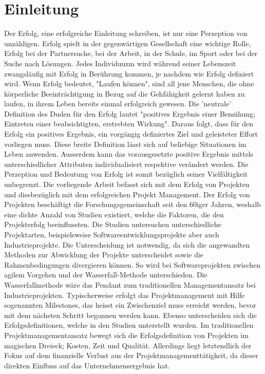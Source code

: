 \section{Einleitung}
Der Erfolg, eine erfolgreiche Einleitung schreiben, ist nur eine Perzeption von unzähligen. Erfolg spielt in der gegenwärtigen Gesellschaft eine wichtige Rolle, Erfolg bei der Partnersuche, bei der Arbeit, in der Schule, im Sport oder bei der Suche nach Lösungen. Jedes Individuuzm wird während seiner Lebenszeit zwangsläufig mit Erfolg in Berührung kommen, je nachdem wie Erfolg definiert wird. Wenn Erfolg bedeutet, "Laufen können", sind all jene Menschen, die ohne körperliche Beeinträchtigung in Bezug auf die Gehfähigkeit gelernt haben zu laufen, in ihrem Leben bereits einmal erfolgreich gewesen. Die 'neutrale' Definition des Duden für den Erfolg lautet "positives Ergebnis einer Bemühung; Eintreten einer beabsichtigten, erstrebten Wirkung". Daraus folgt, dass für den Erfolg ein positives Ergebnis, ein vorgängig definiertes Ziel und geleisteter Effort vorliegen muss. Diese breite Definition lässt sich auf beliebige Situationen im Leben anwenden. Ausserdem kann das vorausgesetzte positive Ergebnis mittels unterschiedlicher Attributen individualisiert respektive verändert werden. Die Perzeption und Bedeutung von Erfolg ist somit bezüglich seiner Vielfältigkeit unbegrenzt.
\newline Die vorliegende Arbeit befasst sich mit dem Erfolg von Projekten und diesbezüglich mit dem erfolgreichen Projekt Management. Der Erfolg von Projekten beschäftigt die Forschungsgemeinschaft seit den 60iger Jahren, weshalb eine dichte Anzahl von Studien existiert, welche die Faktoren, die den Projekterfolg beeinflussten. Die Studien untersuchen unterschiedliche Projektarten, beispielsweise Softwareentwicklungsprojekte aber auch Industrieprojekte. Die Unterscheidung ist notwendig, da sich die angewandten Methoden zur Abwicklung der Projekte unterscheidet sowie die Rahmenbedingungen divergieren können. So wird bei Softwareprojekten zwischen agilem Vorgehen und der Wasserfall-Methode unterschieden. Die Wasserfallmethode wäre das Pendant zum traditionellen Managementansatz bei Industrieprojekten. Typischerweise erfolgt das Projektmanagement mit Hilfe sogenannten Milestones, das heisst ein Zwischenziel muss erreicht werden, bevor mit dem nächsten Schritt begonnen werden kann. Ebenso unterscheiden sich die Erfolgsdefinitionen, welche in den Studien unterstellt wurden. Im traditionellen Projektmanagementansatz bewegt sich die Erfolgsdefinition von Projekten im magischen Dreieck; Kosten, Zeit und Qualität. Allerdings liegt letztendlich der Fokus auf dem finanzielle Verlust aus der Projektmanagementtätigkeit, da dieser direkten Einfluss auf das Unternehmensergebnis hat.
